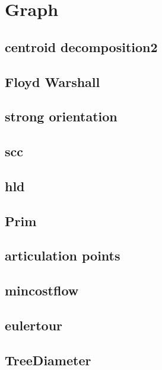 \section{Graph}
\subsection{centroid decomposition2}
\raggedbottom
\hrulefill
\subsection{Floyd Warshall}
\raggedbottom
\hrulefill
\subsection{strong orientation}
\raggedbottom
\hrulefill
\subsection{scc}
\raggedbottom
\hrulefill
\subsection{hld}
\raggedbottom
\hrulefill
\subsection{Prim}
\raggedbottom
\hrulefill
\subsection{articulation points}
\raggedbottom
\hrulefill
\subsection{mincostflow}
\raggedbottom
\hrulefill
\subsection{eulertour}
\raggedbottom
\hrulefill
\subsection{TreeDiameter}
\raggedbottom
\hrulefill
